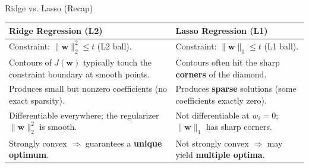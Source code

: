 \documentclass[serif, aspectratio=169]{beamer}
\begin{document}
\begin{frame}{Ridge vs. Lasso (Recap)}
        \begin{table}[h!]
        \centering
        \renewcommand{\arraystretch}{1.4}
        \setlength{\tabcolsep}{8pt}
        \begin{tabular}{|p{}|p{}|}
            \hline
            \textbf{Ridge Regression (L2)} & \textbf{Lasso Regression (L1)} \\
            \hline
            Constraint: $\|\mathbf{w}\|_2^2 \le t$ (L2 ball). &
            Constraint: $\|\mathbf{w} \|_1 \le t$ (L1 ball). \\
            \hline
            Contours of $J(\mathbf{w})$ typically touch the constraint boundary at smooth points. &
            Contours often hit the sharp \textbf{corners} of the diamond. \\
            \hline
            Produces small but nonzero coefficients (no exact sparsity). &
            Produces \textbf{sparse} solutions (some coefficients exactly zero). \\
            \hline
            Differentiable everywhere; the regularizer $\|\mathbf{w}\|_2^2$ is smooth. &
            Not differentiable at $w_i = 0$; $\|\mathbf{w}\|_1$ has sharp corners. \\
            \hline
            Strongly convex $\Rightarrow$ guarantees a \textbf{unique optimum}. &
            Not strongly convex $\Rightarrow$ may yield \textbf{multiple optima}. \\
            \hline
        \end{tabular}
    \end{table}
\end{frame}

\end{document}
